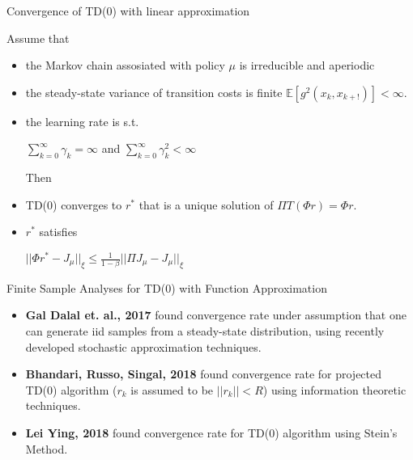 \documentclass{beamer}
\def\E{{\mathbb E}}
\begin{document}
\begin{frame}{Convergence of TD(0) with linear approximation}

\begin{theorem}
Assume that 
\begin{itemize}
\item the Markov chain assosiated with policy $\mu$ is irreducible and aperiodic
\item  the steady-state variance of transition costs is finite $\E[g^2(x_k, x_{k+!})]<\infty$.

\item the learning rate is s.t.
\begin{center}
$\sum\limits_{k=0}^\infty \gamma_k = \infty$ and $\sum\limits_{k=0}^\infty \gamma_k^2< \infty$
\end{center}

Then 

\item  TD(0) converges to $r^*$ that is a unique solution of $\Pi T(\Phi r) = \Phi r$.

 \item $r^*$ satisfies
 
\begin{center}
 $
 || \Phi r^* - J_\mu ||_\xi\leq \frac{1}{1-\beta} || \Pi J_\mu - J_\mu ||_\xi
 $
\end{center}
 
 \end{itemize}
\end{theorem}


\end{frame}





\begin{frame}{Finite Sample Analyses for TD(0) with Function Approximation}
\begin{itemize}
  \item \textbf{Gal Dalal et. al., 2017} found convergence rate under assumption that one can generate iid samples from a steady-state distribution, using recently developed stochastic approximation
techniques.
  \item  \textbf{Bhandari,  Russo,  Singal, 2018} found convergence rate for projected TD(0) algorithm ($r_k$ is assumed to be $||r_k||<R$) using information theoretic techniques.
  \item \textbf{Lei Ying, 2018}  found convergence rate for TD(0) algorithm  using Stein's Method.
\end{itemize}


\end{frame}
\end{document}
